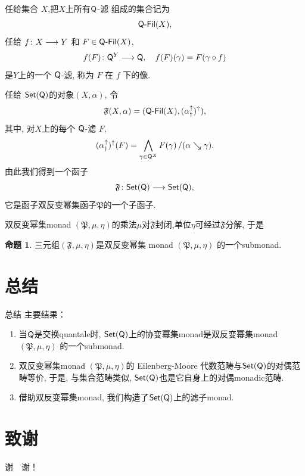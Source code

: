 \documentclass[UTF8]{beamer}
\theoremstyle{definition}
\newtheorem{prop}[thm]{命题}
\theoremstyle{definition}
\DeclareMathOperator{\ldd}{/}
\newcommand{\sQ}{{\sf Q}}
\newcommand{\setQ}{{\sf Set}(\sQ)}
\newcommand{\Set}{\sf Set}
\newcommand{\bw}{\bigwedge}
\newcommand{\FQ}{\sQ\text{-}{\sf Fil}}
\numberwithin{equation}{section}
\begin{document}
\begin{frame}
任给集合 $X$,把$X$上所有$\sQ$-滤 组成的集合记为$$\FQ(X),$$ 任给 $f\colon X\longrightarrow Y$ 和 $F\in\FQ(X)$,   $$f(F)\colon\sQ^Y\lra\sQ, \quad f(F)(\gamma)=F(\gamma\circ f) $$   是$Y$上的一个 $\sQ$-滤, 称为 $F$ 在 $f$ 下的像. %
\end{frame}


\begin{frame}
任给 $\setQ$的对象$(X,\alpha)$, 令 \[\mathfrak{F}(X,\alpha)= (\FQ(X),(\alpha_\dag^\uparrow)^\uparrow),\] 其中, 对$X$上的每个  $\sQ$-滤 $F$,   \[(\alpha_\dag^\uparrow)^\uparrow(F) = \bw_{\gamma\in\sQ^X}F(\gamma)\ldd(\alpha\searrow\gamma).\] 		由此我们得到一个函子 $$\mathfrak{F}\colon\setQ\lra\setQ,$$  它是函子双反变幂集函子$\mathfrak{P}$的一个子函子.  \end{frame}

\begin{frame}
双反变幂集monad $(\mathfrak{P},\mu,\eta)$的乘法$\mu$对$\mathfrak{F}$封闭,单位$\eta$可经过$\mathfrak{F}$分解, 于是

\begin{prop} 三元组\((\mathfrak{F},\mu,\eta)\)是双反变幂集 monad $(\mathfrak{P},\mu,\eta)$ 的一个submonad. \end{prop}
\end{frame}

\section*{总结}
\begin{frame}{总结}
主要结果：
\begin{enumerate}[label={(\arabic*)}] \setlength{\itemsep}{0pt}
\item  当$\sQ$是交换quantale时, $\Set(\sQ)$上的协变幂集monad是双反变幂集monad $(\mathfrak{P},\mu,\eta)$ 的一个submonad.

\item 双反变幂集monad $(\mathfrak{P},\mu,\eta)$的 Eilenberg-Moore 代数范畴与$\Set(\sQ)$的对偶范畴等价, 于是, 与集合范畴类似, $\Set(\sQ)$也是它自身上的对偶monadic范畴.

\item  借助双反变幂集monad, 我们构造了$\Set(\sQ)$上的滤子monad.   \end{enumerate}
\end{frame}

\section*{致谢}
\begin{frame}

\centering\Huge 谢\ \ 谢！
\end{frame}
\end{document}
